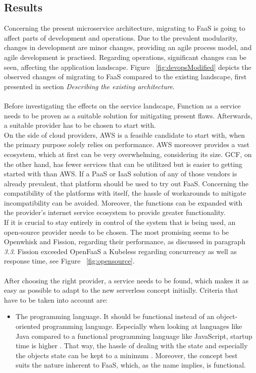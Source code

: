 \documentclass[a4paper,twoside,11pt, pagesize]{scrartcl}
\begin{document}
\begin{spacing}{1.2}
\subsection{Results}
Concerning the present microservice architecture, migrating to FaaS is going to affect parts of development and operations. Due to the prevalent modularity, changes in development are minor changes, providing an agile process model, and agile development is practised. Regarding operations, significant changes can be seen, affecting the application landscape. Figure ~\ref{fig:devopsModified} depicts the observed changes of migrating to FaaS compared to the existing landscape, first presented in section \textit{Describing the existing architecture}.\\\\ Before investigating the effects on the service landscape, Function as a service needs to be proven as a suitable solution for mitigating present flaws. Afterwards, a suitable provider has to be chosen to start with.\\On the side of cloud providers, AWS is a feasible candidate to start with, when the primary purpose solely relies on performance. AWS moreover provides a vast ecosystem, which at first can be very overwhelming, considering its size. GCF, on the other hand, has fewer services that can be utilitzed but is easier to getting started with than AWS. If a PaaS or IaaS solution of any of those vendors is already prevalent, that platform should be used to try out FaaS. Concerning the compatibility of the platforms with itself, the hassle of workarounds to mitigate incompatibility can be avoided. Moreover, the functions can be expanded with the provider's internet service ecosystem to provide greater functionality.\\If it is crucial to stay entirely in control of the system that is being used, an open-source provider needs to be chosen. The most promising seems to be Openwhisk and Fission, regarding their performance, as discussed in paragraph \textit{3.3}. Fission exceeded OpenFaaS a Kubeless regarding concurrency as well as response time, see Figure ~\ref{fig:opensource}.\\\\ After choosing the right provider, a service needs to be found, which makes it as easy as possible to adapt to the new serverless concept initially. Criteria that have to be taken into account are:
\begin{itemize}
  \item[1.] The programming language. It should be functional instead of an object-oriented programming language. Especially when looking at languages like Java compared to a functional programming language like JavaScript, startup time is higher \cite{manner2018cold}. That way, the hassle of dealing with the state and especially the objects state can be kept to a minimum \cite{bardsley2018serverless}. Moreover, the concept best suits the nature inherent to FaaS, which, as the name implies, is functional.

\end{itemize}
\end{spacing}
\end{document}
